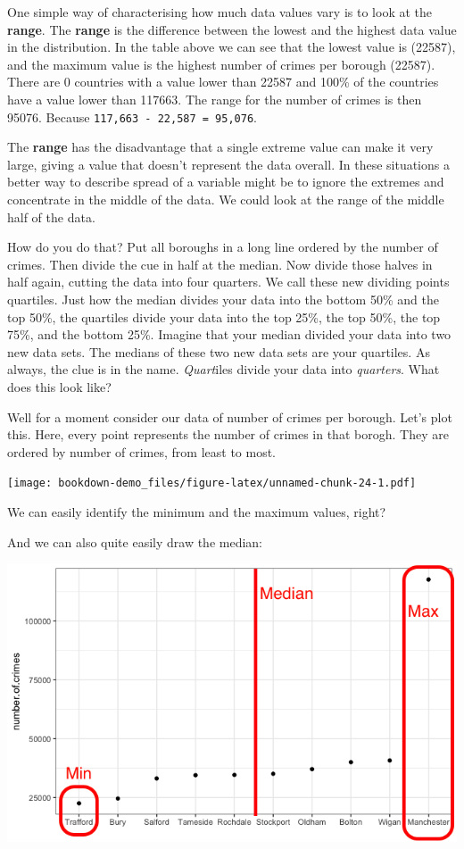 \documentclass[]{book}
\theoremstyle{definition}
\theoremstyle{definition}
\theoremstyle{definition}
\theoremstyle{remark}
\begin{document}
One simple way of characterising how much data values vary is to look at
the \textbf{range}. The \textbf{range} is the difference between the
lowest and the highest data value in the distribution. In the table
above we can see that the lowest value is (22587), and the maximum value
is the highest number of crimes per borough (22587). There are 0
countries with a value lower than 22587 and 100\% of the countries have
a value lower than 117663. The range for the number of crimes is then
95076. Because \texttt{117,663\ -\ 22,587\ =\ 95,076}.

The \textbf{range} has the disadvantage that a single extreme value can
make it very large, giving a value that doesn't represent the data
overall. In these situations a better way to describe spread of a
variable might be to ignore the extremes and concentrate in the middle
of the data. We could look at the range of the middle half of the data.

How do you do that? Put all boroughs in a long line ordered by the
number of crimes. Then divide the cue in half at the median. Now divide
those halves in half again, cutting the data into four quarters. We call
these new dividing points quartiles. Just how the median divides your
data into the bottom 50\% and the top 50\%, the quartiles divide your
data into the top 25\%, the top 50\%, the top 75\%, and the bottom 25\%.
Imagine that your median divided your data into two new data sets. The
medians of these two new data sets are your quartiles. As always, the
clue is in the name. \emph{Quart}iles divide your data into
\emph{quarters}. What does this look like?

Well for a moment consider our data of number of crimes per borough.
Let's plot this. Here, every point represents the number of crimes in
that borogh. They are ordered by number of crimes, from least to most.

\texttt{[image: bookdown-demo\_files/figure-latex/unnamed-chunk-24-1.pdf]}

We can easily identify the minimum and the maximum values, right?

And we can also quite easily draw the median:

\includegraphics{imgs/crimes_dotplot.png}
\end{document}
